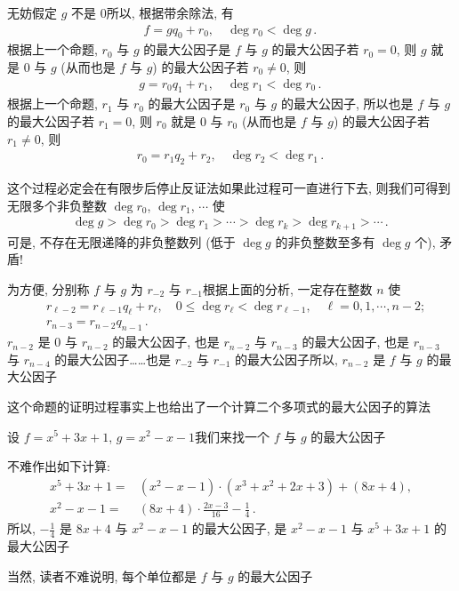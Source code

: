 \begin{pf}
    无妨假定 $g$ 不是 $0$\period 所以, 根据带余除法, 有
    \begin{align*}
        f = gq_0 + r_0, \quad \deg r_0 < \deg g \period
    \end{align*}
    根据上一个命题, $r_0$ 与 $g$ 的最大公因子是 $f$ 与 $g$ 的最大公因子\period 若 $r_0 = 0$, 则 $g$ 就是 $0$ 与 $g$ (从而也是 $f$ 与 $g$) 的最大公因子\period 若 $r_0 \neq 0$, 则
    \begin{align*}
        g = r_0 q_1 + r_1, \quad \deg r_1 < \deg r_0 \period
    \end{align*}
    根据上一个命题, $r_1$ 与 $r_0$ 的最大公因子是 $r_0$ 与 $g$ 的最大公因子, 所以也是 $f$ 与 $g$ 的最大公因子\period 若 $r_1 = 0$, 则 $r_0$ 就是 $0$ 与 $r_0$ (从而也是 $f$ 与 $g$) 的最大公因子\period 若 $r_1 \neq 0$, 则
    \begin{align*}
        r_0 = r_1 q_2 + r_2, \quad \deg r_2 < \deg r_1 \period
    \end{align*}

    这个过程必定会在有限步后停止\period 反证法\period 如果此过程可一直进行下去, 则我们可得到无限多个非负整数 $\deg r_0$, $\deg r_1$, $\cdots$ 使
    \begin{align*}
        \deg g > \deg r_0 > \deg r_1 > \cdots > \deg r_k > \deg r_{k+1} > \cdots \period
    \end{align*}
    可是, 不存在无限递降的非负整数列 (低于 $\deg g$ 的非负整数至多有 $\deg g$ 个), 矛盾!

    为方便, 分别称 $f$ 与 $g$ 为 $r_{-2}$ 与 $r_{-1}$\period 根据上面的分析, 一定存在整数 $n$ 使
    \begin{align*}
         & r_{\ell - 2} = r_{\ell - 1} q_{\ell} + r_{\ell}, \quad 0 \leq \deg r_{\ell} < \deg r_{\ell - 1}, \quad \ell = 0,1,\cdots,n-2; \\
         & r_{n - 3} = r_{n - 2} q_{n - 1} \period
    \end{align*}
    $r_{n-2}$ 是 $0$ 与 $r_{n-2}$ 的最大公因子, 也是 $r_{n-2}$ 与 $r_{n-3}$ 的最大公因子, 也是 $r_{n-3}$ 与 $r_{n-4}$ 的最大公因子……也是 $r_{-2}$ 与 $r_{-1}$ 的最大公因子\period 所以, $r_{n-2}$ 是 $f$ 与 $g$ 的最大公因子\period
\end{pf}

这个命题的证明过程事实上也给出了一个计算二个多项式的最大公因子的算法\period

\begin{example}
    设 $f = x^5 + 3x + 1$, $g = x^2 - x - 1$\period 我们来找一个 $f$ 与 $g$ 的最大公因子\period

    不难作出如下计算:
    \begin{align*}
        x^5 + 3x + 1 = {} & (x^2 - x - 1) \cdot (x^3 + x^2 + 2x + 3) + (8x + 4),   \\
        x^2 - x - 1  = {} & (8x + 4) \cdot \frac{2x - 3}{16} - \frac{1}{4} \period
    \end{align*}
    所以, $-\frac{1}{4}$ 是 $8x + 4$ 与 $x^2 - x - 1$ 的最大公因子, 是 $x^2 - x - 1$ 与 $x^5 + 3x + 1$ 的最大公因子\period

    当然, 读者不难说明, 每个单位都是 $f$ 与 $g$ 的最大公因子\period
\end{example}

